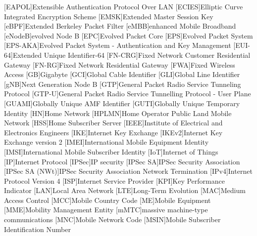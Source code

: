 \begin{multicols}{2}
\begin{acronym}[WPA]
        [EAPOL]{Extensible Authentication Protocol Over LAN}
        [ECIES]{Elliptic Curve Integrated Encryption Scheme}
        [EMSK]{Extended Master Session Key}
        [eBPF]{Extended Berkeley Packet Filter}
        [eMBB]{enhanced Mobile Broadband}
        [eNodeB]{evolved Node B}
        [EPC]{Evolved Packet Core}
        [EPS]{Evolved Packet System}
        [EPS-AKA]{Evolved Packet System - Authentication and Key Management}
        [EUI-64]{Extended Unique Identifier-64}
        [FN-CRG]{Fixed Network Customer Residential Gateway}
        [FN-RG]{Fixed Network Residential Gateway}
        [FWA]{Fixed Wireless Access}
        [GB]{Gigabyte}
        [GCI]{Global Cable Identifier}
        [GLI]{Global Line Identifier}
        [gNB]{Next Generation Node B}
        [GTP]{General Packet Radio Service Tunneling Protocol}
        [GTP-U]{General Packet Radio Service Tunnelling Protocol - User Plane}
        [GUAMI]{Globally Unique AMF Identifier}
        [GUTI]{Globally Unique Temporary Identity}
        [HN]{Home Network}
        [HPLMN]{Home Operator Public Land Mobile Network}
        [HSS]{Home Subscriber Server}
        [IEEE]{Institute of Electrical and Electronics Engineers}
        [IKE]{Internet Key Exchange}
        [IKEv2]{Internet Key Exchange version 2}
        [IMEI]{International Mobile Equipment Identity}
        [IMSI]{International Mobile Subscriber Identity}
        [IoT]{Internet of Things}
        [IP]{Internet Protocol}
        [IPSec]{IP security}
        [IPSec SA]{IPSec Security Association}
        [IPSec SA (NWt)]{IPSec Security Association Network Termination}
        [IPv4]{Internet Protocol Version 4}
        [ISP]{Internet Service Provider}
        [KPI]{Key Performance Indicator}
        [LAN]{Local Area Network}
        [LTE]{Long-Term Evolution}
        [MAC]{Medium Access Control}
        [MCC]{Mobile Country Code}
        [ME]{Mobile Equipment}
        [MME]{Mobility Management Entity}
        [mMTC]{massive machine-type communications}
        [MNC]{Mobile Network Code}
        [MSIN]{Mobile Subscriber Identification Number}

\end{acronym}
\end{multicols}
